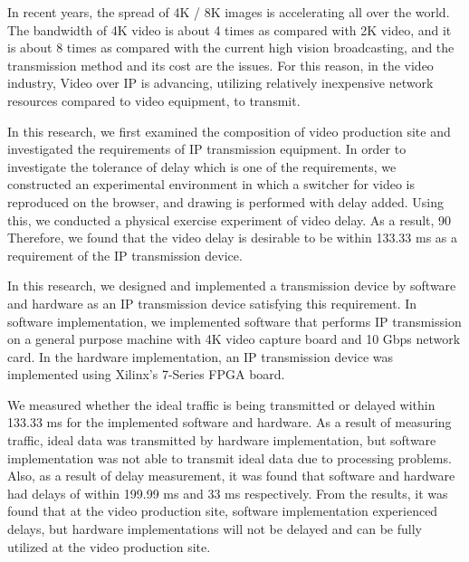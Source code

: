\begin{jabstract}


\end{jabstract}


\begin{eabstract}

In recent years, the spread of 4K / 8K images is accelerating all over the world.
The bandwidth of 4K video is about 4 times as compared with 2K video, and it is about 8 times as compared with the current high vision broadcasting, and the transmission method and its cost are the issues.
For this reason, in the video industry, Video over IP is advancing, utilizing relatively inexpensive network resources compared to video equipment, to transmit.

In this research, we first examined the composition of video production site and investigated the requirements of IP transmission equipment.
In order to investigate the tolerance of delay which is one of the requirements, we constructed an experimental environment in which a switcher for video is reproduced on the browser, and drawing is performed with delay added.
Using this, we conducted a physical exercise experiment of video delay. As a result, 90%
Therefore, we found that the video delay is desirable to be within 133.33 ms as a requirement of the IP transmission device.

In this research, we designed and implemented a transmission device by software and hardware as an IP transmission device satisfying this requirement.
In software implementation, we implemented software that performs IP transmission on a general purpose machine with 4K video capture board and 10 Gbps network card.
In the hardware implementation, an IP transmission device was implemented using Xilinx's 7-Series FPGA board.

We measured whether the ideal traffic is being transmitted or delayed within 133.33 ms for the implemented software and hardware.
As a result of measuring traffic, ideal data was transmitted by hardware implementation, but software implementation was not able to transmit ideal data due to processing problems.
Also, as a result of delay measurement, it was found that software and hardware had delays of within 199.99 ms and 33 ms respectively.
From the results, it was found that at the video production site, software implementation experienced delays, but hardware implementations will not be delayed and can be fully utilized at the video production site.

\end{eabstract}
